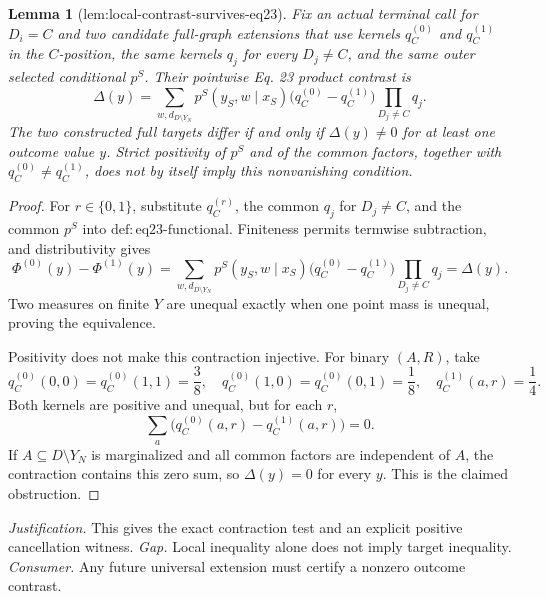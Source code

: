 \documentclass{article}
\newtheorem{lemma}{Lemma}
\begin{document}
\begin{lemma}[lem:local-contrast-survives-eq23]\label{lem:local-contrast-survives-eq23}
Fix an actual terminal call for \(D_i=C\) and two candidate full-graph extensions that use kernels \(q_C^{(0)}\) and \(q_C^{(1)}\) in the \(C\)-position, the same kernels \(q_j\) for every \(D_j\ne C\), and the same outer selected conditional \(p^S\). Their pointwise Eq. 23 product contrast is
\[
 \Delta(y)=\sum_{w,d_{D\setminus Y_N}}
 p^S(y_S,w\mid x_S)
 \bigl(q_C^{(0)}-q_C^{(1)}\bigr)
 \prod_{D_j\ne C}q_j.
\]
The two constructed full targets differ if and only if \(\Delta(y)\ne0\) for at least one outcome value \(y\). Strict positivity of \(p^S\) and of the common factors, together with \(q_C^{(0)}\ne q_C^{(1)}\), does not by itself imply this nonvanishing condition.
\end{lemma}
\begin{proof}
For \(r\in\{0,1\}\), substitute \(q_C^{(r)}\), the common \(q_j\) for \(D_j\ne C\), and the common \(p^S\) into \(\mathrm{def:eq23\text{-}functional}\). Finiteness permits termwise subtraction, and distributivity gives
\[
 \Phi^{(0)}(y)-\Phi^{(1)}(y)
 =\sum_{w,d_{D\setminus Y_N}}
 p^S(y_S,w\mid x_S)
 \bigl(q_C^{(0)}-q_C^{(1)}\bigr)
 \prod_{D_j\ne C}q_j
 =\Delta(y).
\]
Two measures on finite \(Y\) are unequal exactly when one point mass is unequal, proving the equivalence.

Positivity does not make this contraction injective. For binary \((A,R)\), take
\[
 q_C^{(0)}(0,0)=q_C^{(0)}(1,1)=\frac38,\quad
 q_C^{(0)}(1,0)=q_C^{(0)}(0,1)=\frac18,\quad
 q_C^{(1)}(a,r)=\frac14.
\]
Both kernels are positive and unequal, but for each \(r\),
\[
 \sum_a\bigl(q_C^{(0)}(a,r)-q_C^{(1)}(a,r)\bigr)=0.
\]
If \(A\subseteq D\setminus Y_N\) is marginalized and all common factors are independent of \(A\), the contraction contains this zero sum, so \(\Delta(y)=0\) for every \(y\). This is the claimed obstruction.
\end{proof}
\par\smallskip\noindent \textit{Justification.} This gives the exact contraction test and an explicit positive cancellation witness. \textit{Gap.} Local inequality alone does not imply target inequality. \textit{Consumer.} Any future universal extension must certify a nonzero outcome contrast.
\end{document}
